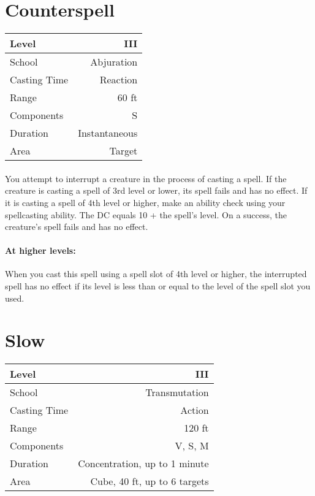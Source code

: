 \documentclass[a5paper,12pt]{article}
\begin{document}
\section*{Counterspell}
\begin{table}[h]
   \centering
   \begin{tabular}{|l|r|}
      \hline
      Level        & III \\
      \hline
      School       & Abjuration \\
      \hline
      Casting Time & Reaction \\
      \hline
      Range        & 60 ft \\
      \hline
      Components   & S \\
      \hline
      Duration     & Instantaneous \\
      \hline
      Area         & Target \\
      \hline
   \end{tabular}
\end{table}

\paragraph{}
You attempt to interrupt a creature in the process of casting a spell. If the creature is casting a spell of 3rd level or lower, its spell fails and has no effect. If it is casting a spell of 4th level or higher, make an ability check using your spellcasting ability. The DC equals 10 + the spell's level. On a success, the creature's spell fails and has no effect.

\paragraph{At higher levels:}
When you cast this spell using a spell slot of 4th level or higher, the interrupted spell has no effect if its level is less than or equal to the level of the spell slot you used.

\newpage

\section*{Slow}
\begin{table}[h]
   \centering
   \begin{tabular}{|l|r|}
      \hline
      Level        & III \\
      \hline
      School       & Transmutation \\
      \hline
      Casting Time & Action \\
      \hline
      Range        & 120 ft \\
      \hline
      Components   & V, S, M \\
      \hline
      Duration     & Concentration, up to 1 minute\\
      \hline
      Area         & Cube, 40 ft, up to 6 targets\\
      \hline
   \end{tabular}
\end{table}
\end{document}
